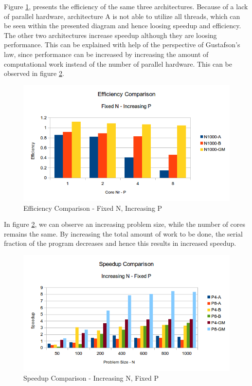 \documentclass[conference]{IEEEtran}
\begin{document}
Figure \ref{pic:omp_efficiency_comp}, presents the efficiency of the same three architectures. Because of a lack of parallel hardware, architecture A is not able to utilize all threads, which can be seen within the presented diagram and hence loosing speedup and efficiency. The other two architectures increase speedup although they are loosing performance. This can be explained with help of the perspective of Gustafson’s law, since performance can be increased by increasing the amount of computational work instead of the number of parallel hardware. This can be observed in figure \ref{pic:omp_speedup_comp2}. 

\begin{figure}[h]
  \centering
  \includegraphics[scale=0.55]{pic/omp_efficiency_comp.png} 
  \caption{Efficiency Comparison - Fixed N, Increasing P}
  \label{pic:omp_efficiency_comp}
\end{figure}

In figure \ref{pic:omp_speedup_comp2}, we can observe an increasing problem size, while the number of cores remains the same. By increasing the total amount of work to be done, the serial fraction of the program decreases and hence this results in increased speedup.

\begin{figure}[h]
  \centering
  \includegraphics[scale=0.55]{pic/omp_speedup2_comp.png} 
  \caption{Speedup Comparison - Increasing N, Fixed P}
  \label{pic:omp_speedup_comp2}
\end{figure}
\end{document}
